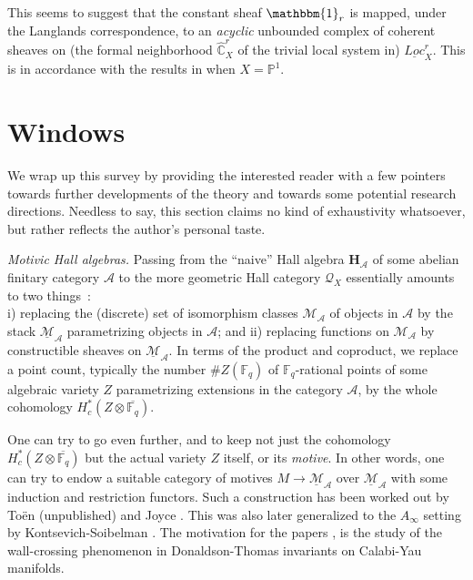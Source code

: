 \documentclass[a4paper,10pt]{amsart}
\numberwithin{equation}{section}
\begin{document}
\vspace{.1in}

This seems to suggest that the constant sheaf $\mathbbm{1}_r$ is mapped, under the Langlands correspondence, to an \textit{acyclic} unbounded complex of
coherent sheaves on (the formal neighborhood $\widehat{\mathbb{C}}_X^r$ of the trivial local system in) $\underline{Loc}^r_X$. This is in accordance with the results in \cite{Lafforgue} when $X=\mathbb{P}^1$.

\newpage

\section*{Windows}

\setcounter{section}{6}
\setcounter{theo}{0}
\setcounter{equation}{0}

\vspace{.2in}

We wrap up this survey by providing the interested reader with a few pointers towards further developments of the theory and towards some potential research directions.
Needless to say, this section claims no kind of exhaustivity whatsoever, but rather reflects the author's personal taste.

\vspace{.2in}

\noindent
\textit{Motivic Hall algebras.} Passing from the ``naive'' Hall algebra $\mathbf{H}_\mathcal{A}$ of some abelian finitary category $\mathcal{A}$ to the more
geometric Hall category $\mathcal{Q}_X$ essentially amounts to two things~: \\
i) replacing the (discrete) set of isomorphism classes $\mathcal{M}_{\mathcal{A}}$ of objects in
$\mathcal{A}$ by the stack $\underline{\mathcal{M}}_{\mathcal{A}}$ parametrizing objects in $\mathcal{A}$; and ii) replacing functions on $\mathcal{M}_{\mathcal{A}}$ by 
constructible sheaves on $\underline{\mathcal{M}}_{\mathcal{A}}$. In terms of the product and coproduct, we replace a point count, typically the number $\#Z(\mathbb{F}_q)$ of $\mathbb{F}_q$-rational points of some algebraic variety $Z$ parametrizing extensions in the category $\mathcal{A}$, by the whole cohomology $H^*_c(Z \otimes \overline{\mathbb{F}_q})$.

One can try to go even further, and to keep not just the cohomology $H^*_c(Z\otimes \overline{\mathbb{F}_q})$ but the actual variety $Z$ itself, or its \textit{motive}. In other words, one can try to endow a suitable category of motives $M \to \underline{\mathcal{M}}_{\mathcal{A}}$ over $\underline{\mathcal{M}}_{\mathcal{A}}$ with some induction and restriction functors. Such a construction has been worked out by To\"en (unpublished) and Joyce \cite{Joyce2}. This was also later generalized to the $A_{\infty}$ setting by Kontsevich-Soibelman \cite{KoSoi}. The motivation for the papers \cite{Joyce2}, \cite{KoSoi} is the study of the wall-crossing phenomenon in
Donaldson-Thomas invariants on Calabi-Yau manifolds.
\end{document}
